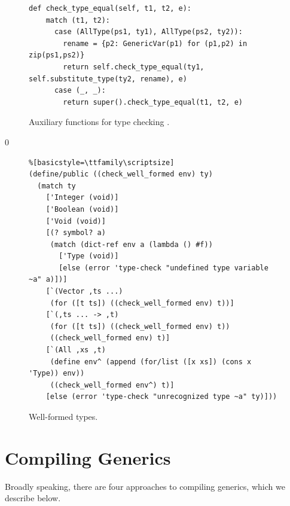 \documentclass[7x10]{TimesAPriori_MIT}%
\def\racketEd{0}
\def\edition{0}
\numberwithin{theorem}{chapter}
\numberwithin{definition}{chapter}
\numberwithin{equation}{chapter}
\begin{document}
\begin{figure}[tbp]
\begin{tcolorbox}[colback=white]
\begin{lstlisting}[basicstyle=\ttfamily\scriptsize]
def check_type_equal(self, t1, t2, e):
    match (t1, t2):
      case (AllType(ps1, ty1), AllType(ps2, ty2)):
        rename = {p2: GenericVar(p1) for (p1,p2) in zip(ps1,ps2)}
        return self.check_type_equal(ty1, self.substitute_type(ty2, rename), e)
      case (_, _):
        return super().check_type_equal(t1, t2, e)
\end{lstlisting}
\fi
\end{tcolorbox}

\caption{Auxiliary functions for type checking \LangPoly{}.}
\label{fig:type-check-Lpoly-aux}
\end{figure}


\if\edition\racketEd    
\begin{figure}[tbp]
\begin{tcolorbox}[colback=white]  
\begin{lstlisting}%[basicstyle=\ttfamily\scriptsize]
(define/public ((check_well_formed env) ty)
  (match ty
    ['Integer (void)]
    ['Boolean (void)]
    ['Void (void)]
    [(? symbol? a)
     (match (dict-ref env a (lambda () #f))
       ['Type (void)]
       [else (error 'type-check "undefined type variable ~a" a)])]
    [`(Vector ,ts ...)
     (for ([t ts]) ((check_well_formed env) t))]
    [`(,ts ... -> ,t)
     (for ([t ts]) ((check_well_formed env) t))
     ((check_well_formed env) t)]
    [`(All ,xs ,t)
     (define env^ (append (for/list ([x xs]) (cons x 'Type)) env))
     ((check_well_formed env^) t)]
    [else (error 'type-check "unrecognized type ~a" ty)]))
\end{lstlisting}
\end{tcolorbox}

\caption{Well-formed types.}
\label{fig:well-formed-types}
\end{figure}
\fi

\clearpage

\section{Compiling Generics}
\label{sec:compiling-poly}

Broadly speaking, there are four approaches to compiling generics,
which we describe below.
\end{document}
